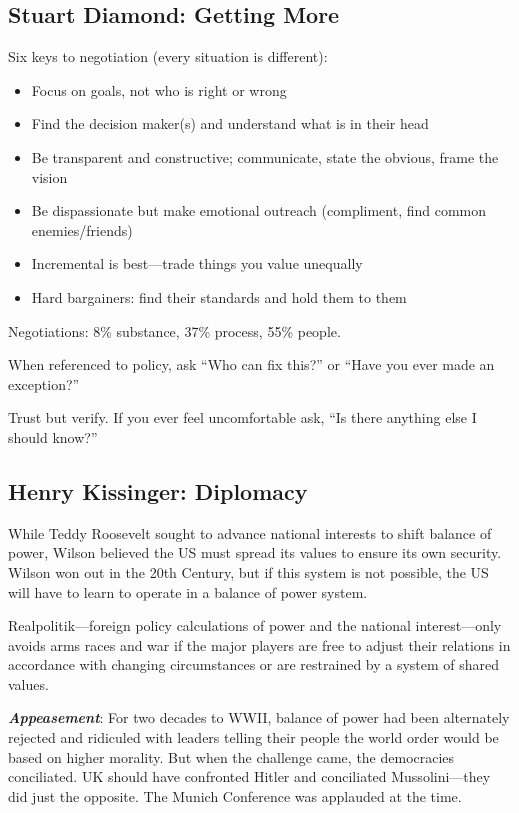 \documentclass[
]{article}
\begin{document}
\hypertarget{stuart-diamond-getting-more}{%
\subsection{Stuart Diamond: Getting
More}\label{stuart-diamond-getting-more}}

Six keys to negotiation (every situation is different):

\begin{itemize}
\item
  Focus on goals, not who is right or wrong
\item
  Find the decision maker(s) and understand what is in their head
\item
  Be transparent and constructive; communicate, state the obvious, frame
  the vision
\item
  Be dispassionate but make emotional outreach (compliment, find common
  enemies/friends)
\item
  Incremental is best---trade things you value unequally
\item
  Hard bargainers: find their standards and hold them to them
\end{itemize}

Negotiations: 8\% substance, 37\% process, 55\% people.

When referenced to policy, ask ``Who can fix this?'' or ``Have you ever
made an exception?''

Trust but verify. If you ever feel uncomfortable ask, ``Is there
anything else I should know?''

\hypertarget{henry-kissinger-diplomacy}{%
\subsection{Henry Kissinger:
Diplomacy}\label{henry-kissinger-diplomacy}}

While Teddy Roosevelt sought to advance national interests to shift
balance of power, Wilson believed the US must spread its values to
ensure its own security. Wilson won out in the 20th Century, but if this
system is not possible, the US will have to learn to operate in a
balance of power system.

Realpolitik---foreign policy calculations of power and the national
interest---only avoids arms races and war if the major players are free
to adjust their relations in accordance with changing circumstances or
are restrained by a system of shared values.

\textbf{\emph{Appeasement}}: For two decades to WWII, balance of power
had been alternately rejected and ridiculed with leaders telling their
people the world order would be based on higher morality. But when the
challenge came, the democracies conciliated. UK should have confronted
Hitler and conciliated Mussolini---they did just the opposite. The
Munich Conference was applauded at the time.
\end{document}
